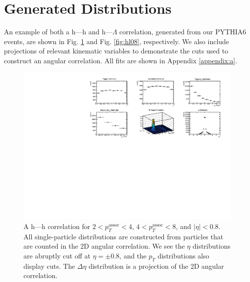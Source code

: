 \documentclass[../main.tex]{subfiles}
\begin{document}
\section{Generated Distributions}
An example of both a h---h and h---$\Lambda$ correlation, generated from our PYTHIA6 events, are shown in Fig. \ref{fig:hh08} and Fig. \ref{fig:hl08}, respectively. We also include projections of relevant kinematic variables to demonstrate the cuts used to construct an angular correlation. All fits are shown in Appendix \ref{appendix:a}. 

\begin{figure}[h]
    \centering
    \includegraphics[scale=0.9]{results/figs/hh08_projections.pdf}
    \caption{A h---h correlation for $2 < p_T^{\text{assoc}} < 4$, $4<p_T^{\text{assoc}}<8$, and $|\eta|<0.8$. All single-particle distributions are constructed from particles that are counted in the 2D angular correlation. We see the $\eta$ distributions are abruptly cut off at $\eta = \pm 0.8$, and the $p_T$ distributions also display cuts. The $\Delta \eta$ distribution is a projection of the 2D angular correlation.}
    \label{fig:hh08}
\end{figure}
\end{document}
